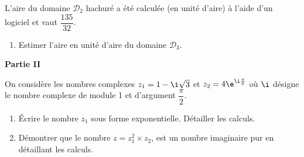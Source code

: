 L'aire du domaine $\mathcal{D}_2$ hachuré a été calculée (en unité d'aire) à l'aide d'un logiciel et vaut $\dfrac{135}{32}$.
\begin{enumerate}[resume]
\item  Estimer l'aire en unité d'aire du domaine $\mathcal{D}_3$.
\end{enumerate}

\bigskip

\textbf{\large Partie II}

\medskip

On considère les nombres complexes $z_1 = 1-\i\sqrt{3}$ et $z_2= 4\e^{\i\frac{\pi}{6}}$ où $\i$ désigne le nombre complexe de module 1 et d'argument $\dfrac{\pi}{2}$.

\begin{enumerate}
\item  Écrire le nombre $z_1$ sous forme exponentielle. Détailler les calculs.

\item Démontrer que le nombre $z = z_1^2 \times  z_2$, est un nombre imaginaire pur en détaillant les calculs.
\end{enumerate}

\bigskip
